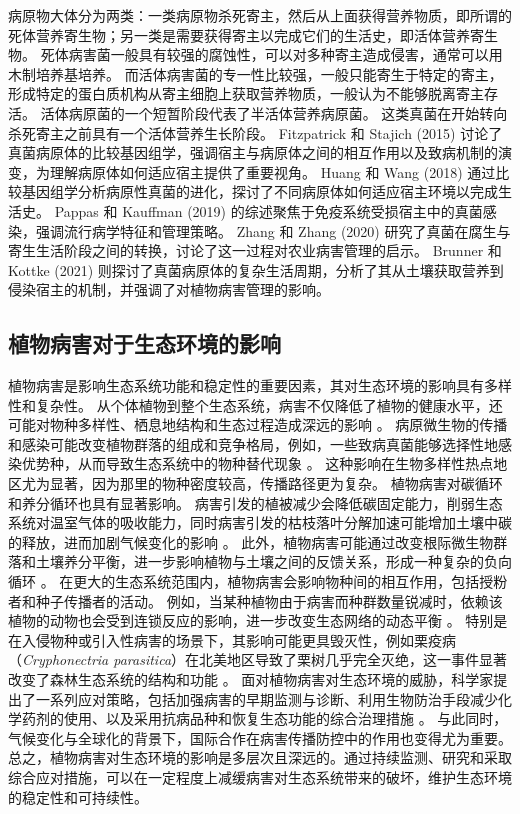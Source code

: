 \documentclass[AutoFakeBold]{LZUThesis-PgD&PhD}
\begin{document}
	病原物大体分为两类：一类病原物杀死寄主，然后从上面获得营养物质，即所谓的死体营养寄生物；另一类是需要获得寄主以完成它们的生活史，即活体营养寄生物。
	死体病害菌一般具有较强的腐蚀性，可以对多种寄主造成侵害，通常可以用木制培养基培养。
	而活体病害菌的专一性比较强，一般只能寄生于特定的寄主，形成特定的蛋白质机构从寄主细胞上获取营养物质，一般认为不能够脱离寄主存活。
	活体病原菌的一个短暂阶段代表了半活体营养病原菌。
	这类真菌在开始转向杀死寄主之前具有一个活体营养生长阶段。
	Fitzpatrick 和 Stajich (2015) 讨论了真菌病原体的比较基因组学，强调宿主与病原体之间的相互作用以及致病机制的演变，为理解病原体如何适应宿主提供了重要视角\cite{fitzpatrick2015comparative}。
	Huang 和 Wang (2018) 通过比较基因组学分析病原性真菌的进化，探讨了不同病原体如何适应宿主环境以完成生活史\cite{huang2018evolution}。
	Pappas 和 Kauffman (2019) 的综述聚焦于免疫系统受损宿主中的真菌感染，强调流行病学特征和管理策略\cite{pappas2019fungal}。
	Zhang 和 Zhang (2020) 研究了真菌在腐生与寄生生活阶段之间的转换，讨论了这一过程对农业病害管理的启示\cite{zhang2020fungi}。
	Brunner 和 Kottke (2021) 则探讨了真菌病原体的复杂生活周期，分析了其从土壤获取营养到侵染宿主的机制，并强调了对植物病害管理的影响\cite{brunner2021complex}。
	
	
	\subsection{植物病害对于生态环境的影响}
	
	植物病害是影响生态系统功能和稳定性的重要因素，其对生态环境的影响具有多样性和复杂性。
	从个体植物到整个生态系统，病害不仅降低了植物的健康水平，还可能对物种多样性、栖息地结构和生态过程造成深远的影响 \cite{Mitchell2002}。
	病原微生物的传播和感染可能改变植物群落的组成和竞争格局，例如，一些致病真菌能够选择性地感染优势种，从而导致生态系统中的物种替代现象 \cite{Garrett2006}。
	这种影响在生物多样性热点地区尤为显著，因为那里的物种密度较高，传播路径更为复杂。
	植物病害对碳循环和养分循环也具有显著影响。
	病害引发的植被减少会降低碳固定能力，削弱生态系统对温室气体的吸收能力，同时病害引发的枯枝落叶分解加速可能增加土壤中碳的释放，进而加剧气候变化的影响 \cite{Allison2008}。
	此外，植物病害可能通过改变根际微生物群落和土壤养分平衡，进一步影响植物与土壤之间的反馈关系，形成一种复杂的负向循环 \cite{Bever2010}。
	在更大的生态系统范围内，植物病害会影响物种间的相互作用，包括授粉者和种子传播者的活动。
	例如，当某种植物由于病害而种群数量锐减时，依赖该植物的动物也会受到连锁反应的影响，进一步改变生态网络的动态平衡 \cite{Maron2011}。
	特别是在入侵物种或引入性病害的场景下，其影响可能更具毁灭性，例如栗疫病（\textit{Cryphonectria parasitica}）在北美地区导致了栗树几乎完全灭绝，这一事件显著改变了森林生态系统的结构和功能 \cite{Anagnostakis1987}。
	面对植物病害对生态环境的威胁，科学家提出了一系列应对策略，包括加强病害的早期监测与诊断、利用生物防治手段减少化学药剂的使用、以及采用抗病品种和恢复生态功能的综合治理措施 \cite{Pautasso2010}。
	与此同时，气候变化与全球化的背景下，国际合作在病害传播防控中的作用也变得尤为重要。
	总之，植物病害对生态环境的影响是多层次且深远的。通过持续监测、研究和采取综合应对措施，可以在一定程度上减缓病害对生态系统带来的破坏，维护生态环境的稳定性和可持续性。
	
\end{document}
